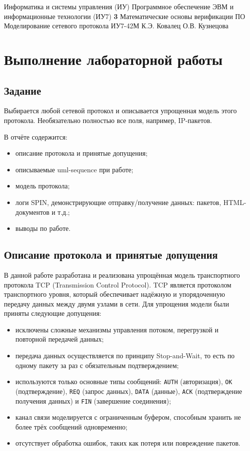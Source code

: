 \documentclass{bmstu}
\begin{document}
\makereporttitle
{Информатика и системы управления (ИУ)}
{Программное обеспечение ЭВМ и информационные технологии (ИУ7)}
{\textbf{3}}
{Математические основы верификации ПО}
{Моделирование сетевого протокола}
{}
{ИУ7-42М}
{К.Э. Ковалец}
{О.В. Кузнецова}


\setcounter{page}{2}


\chapter{Выполнение лабораторной работы}

\section{Задание}

Выбирается любой сетевой протокол и описывается упрощенная модель этого протокола.
Необязательно полностью все поля, например, IP-пакетов.

В отчёте содержится:
\begin{itemize}
  \item описание протокола и принятые допущения;
  \item описываемые uml-sequence при работе;
  \item модель протокола;
  \item логи SPIN, демонстрирующие отправку/получение данных: пакетов, HTML-документов и т.д.;
  \item выводы по работе.
\end{itemize}

\section{Описание протокола и принятые допущения}

В данной работе разработана и реализована упрощённая модель транспортного протокола TCP (Transmission Control Protocol). TCP является протоколом транспортного уровня, который обеспечивает надёжную и упорядоченную передачу данных между двумя узлами в сети. Для упрощения модели были приняты следующие допущения:
\begin{itemize}
  \item исключены сложные механизмы управления потоком, перегрузкой и повторной передачей данных;
  \item передача данных осуществляется по принципу Stop-and-Wait, то есть по одному пакету за раз с обязательным подтверждением;
  \item используются только основные типы сообщений: \texttt{AUTH} (авторизация), \texttt{OK} (подтверждение), \texttt{REQ} (запрос данных), \texttt{DATA} (данные), \texttt{ACK} (подтверждение получения данных) и \texttt{FIN} (завершение соединения);
  \item канал связи моделируется с ограниченным буфером, способным хранить не более трёх сообщений одновременно;
  \item отсутствует обработка ошибок, таких как потеря или повреждение пакетов.
\end{itemize}
\end{document}
